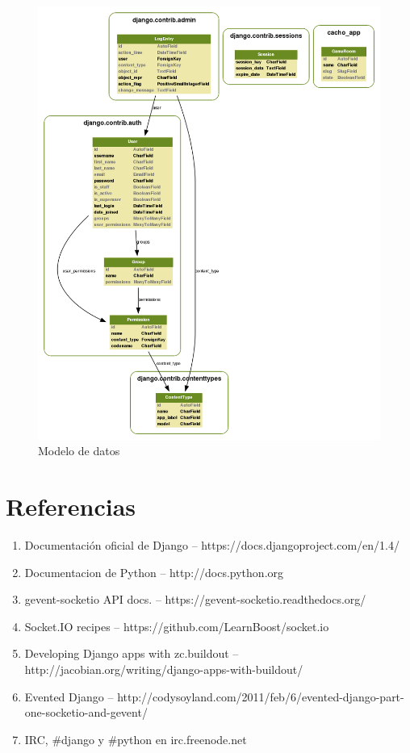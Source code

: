 \documentclass[a4paper,11pt]{article}
\begin{document}
\newpage
\begin{figure}[h!]
	\centering
		\caption{Modelo de datos}
	\includegraphics[width=\textwidth]{md.png}
\end{figure}


\newpage
\section{Referencias}
\begin{enumerate}
	\item Documentación oficial de Django -- https://docs.djangoproject.com/en/1.4/
	\item Documentacion de Python -- http://docs.python.org
	\item gevent-socketio API docs. -- https://gevent-socketio.readthedocs.org/
	\item Socket.IO recipes -- https://github.com/LearnBoost/socket.io
	\item Developing Django apps with zc.buildout -- http://jacobian.org/writing/django-apps-with-buildout/
	\item Evented Django -- http://codysoyland.com/2011/feb/6/evented-django-part-one-socketio-and-gevent/
	\item IRC, \#django y \#python en irc.freenode.net
\end{enumerate}
\end{document}
